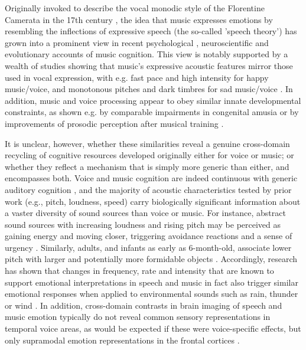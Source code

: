 \documentclass[openacc]{rsprocb_new}%
\begin{document}

\begin{fmtext}
Originally invoked to describe the vocal monodic style of the Florentine Camerata in the 17th century \cite{KIV89}, the idea that music expresses emotions by resembling the inflections of expressive speech (the so-called 'speech theory') has grown into a prominent view in recent psychological \cite{JUS08}, neuroscientific \cite{patel2010music} and evolutionary \cite{FIT13} accounts of music cognition. This view is notably supported by a wealth of studies showing that music's expressive acoustic features mirror those used in vocal expression, with e.g. fast pace and high intensity for happy music/voice, and monotonous pitches and dark timbres for sad music/voice \cite{JUSL03,ilie2006comparison,ROSS07,COU13}. In addition, music and voice processing appear to obey similar innate developmental constraints, as shown e.g. by comparable impairments in congenital amusia \cite{THO12} or by improvements of prosodic perception after musical training \cite{LIM11}.   
\end{fmtext}
\maketitle

It is unclear, however, whether these similarities reveal a genuine cross-domain recycling of cognitive resources developed originally either for voice or music; or whether they reflect a mechanism that is simply more generic than either, and encompasses both. Voice and music cognition are indeed continuous with generic auditory cognition \cite{SCH17}, and the majority of acoustic characteristics tested by prior work (e.g., pitch, loudness, speed) carry biologically significant information about a vaster diversity of sound sources than voice or music. For instance, abstract sound sources with increasing loudness and rising pitch may be perceived as gaining energy and moving closer, triggering avoidance reactions and a sense of urgency \cite{NEU01,TAJ08}. Similarly, adults, and infants as early as 6-month-old, associate lower pitch with larger and potentially more formidable objects \cite{FER15}. Accordingly, research has shown that changes in frequency, rate and intensity that are known to support emotional interpretations in speech and music in fact also trigger similar emotional responses when applied to environmental sounds such as rain, thunder or wind \cite{MA15}. In addition, cross-domain contrasts in brain imaging of speech and music emotion typically do not reveal common sensory representations in temporal voice areas, as would be expected if these were voice-specific effects, but only supramodal emotion representations in the frontal cortices \cite{PEE10,ESC13}. 
\end{document}
